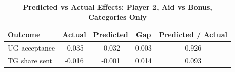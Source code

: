 \begin{table}[!htbp]
\centering
\caption{\textbf{Predicted vs Actual Effects: Player 2, Aid vs Bonus, Categories Only}}
\label{tab:cats_only_aid_vs_bonus_fullpooled_p2_fit}
\begin{tabular}{lcccc}
\toprule
Outcome & Actual & Predicted & Gap & Predicted / Actual \\
\midrule
UG acceptance & -0.035 & -0.032 & 0.003 & 0.926 \\
TG share sent & -0.016 & -0.001 & 0.014 & 0.093 \\
\bottomrule
\end{tabular}
\end{table}
